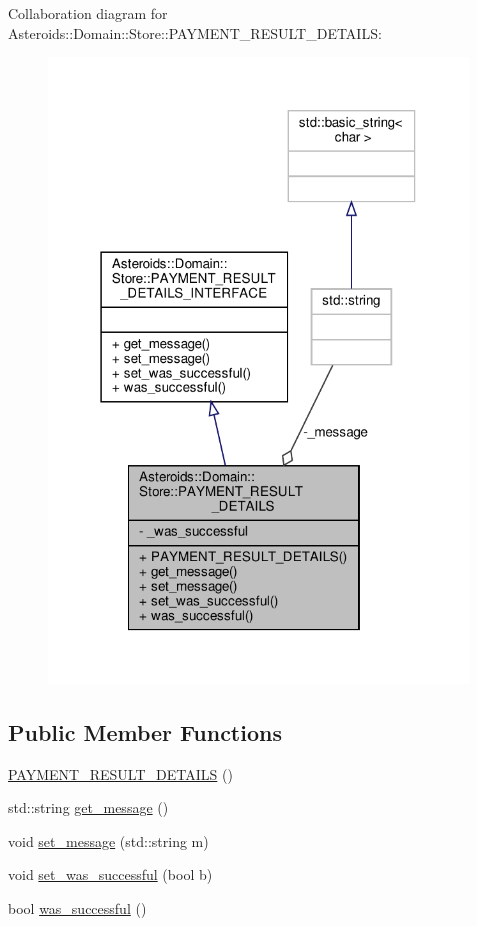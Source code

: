 Collaboration diagram for Asteroids\+:\+:Domain\+:\+:Store\+:\+:P\+A\+Y\+M\+E\+N\+T\+\_\+\+R\+E\+S\+U\+L\+T\+\_\+\+D\+E\+T\+A\+I\+LS\+:\nopagebreak
\begin{figure}[H]
\begin{center}
\leavevmode
\includegraphics[width=316pt]{classAsteroids_1_1Domain_1_1Store_1_1PAYMENT__RESULT__DETAILS__coll__graph}
\end{center}
\end{figure}
\subsection*{Public Member Functions}
\begin{DoxyCompactItemize}
\item 
\hyperlink{classAsteroids_1_1Domain_1_1Store_1_1PAYMENT__RESULT__DETAILS_a82b55a89437535aa8b69781dfa122205}{P\+A\+Y\+M\+E\+N\+T\+\_\+\+R\+E\+S\+U\+L\+T\+\_\+\+D\+E\+T\+A\+I\+LS} ()
\item 
std\+::string \hyperlink{classAsteroids_1_1Domain_1_1Store_1_1PAYMENT__RESULT__DETAILS_ab0e02bd3cbd1b221ca1aac3d7a21484f}{get\+\_\+message} ()
\item 
void \hyperlink{classAsteroids_1_1Domain_1_1Store_1_1PAYMENT__RESULT__DETAILS_a8f093b422a738eb757dc033571ac6352}{set\+\_\+message} (std\+::string m)
\item 
void \hyperlink{classAsteroids_1_1Domain_1_1Store_1_1PAYMENT__RESULT__DETAILS_aca004f43f5b89b0560525e60d171faf2}{set\+\_\+was\+\_\+successful} (bool b)
\item 
bool \hyperlink{classAsteroids_1_1Domain_1_1Store_1_1PAYMENT__RESULT__DETAILS_a9fd78a2e32a59b9b0a372c9422aa61cb}{was\+\_\+successful} ()
\end{DoxyCompactItemize}
